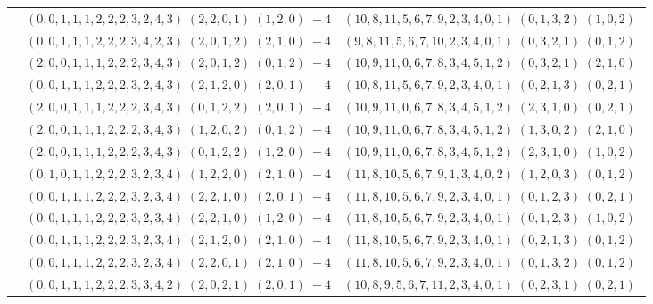 \documentclass[11pt]{article}
\begin{document}
\begin{longtable}[l]{|c|c|c|}
 \cline{2-3} 
 & $(0 ,0 ,1 ,1 ,1 ,2 ,2 ,2 ,3 ,2 ,4 ,3) \;(2 ,2 ,0 ,1) \;(1 ,2 ,0) \;-4$ & $(10 ,8 ,11 ,5 ,6 ,7 ,9 ,2 ,3 ,4 ,0 ,1) \;(0 ,1 ,3 ,2) \;(1 ,0 ,2) \;$\\ 
 \cline{2-3} 
 & $(0 ,0 ,1 ,1 ,1 ,2 ,2 ,2 ,3 ,4 ,2 ,3) \;(2 ,0 ,1 ,2) \;(2 ,1 ,0) \;-4$ & $(9 ,8 ,11 ,5 ,6 ,7 ,10 ,2 ,3 ,4 ,0 ,1) \;(0 ,3 ,2 ,1) \;(0 ,1 ,2) \;$\\ 
 \cline{2-3} 
 & $(2 ,0 ,0 ,1 ,1 ,1 ,2 ,2 ,2 ,3 ,4 ,3) \;(2 ,0 ,1 ,2) \;(0 ,1 ,2) \;-4$ & $(10 ,9 ,11 ,0 ,6 ,7 ,8 ,3 ,4 ,5 ,1 ,2) \;(0 ,3 ,2 ,1) \;(2 ,1 ,0) \;$\\ 
 \cline{2-3} 
 & $(0 ,0 ,1 ,1 ,1 ,2 ,2 ,2 ,3 ,2 ,4 ,3) \;(2 ,1 ,2 ,0) \;(2 ,0 ,1) \;-4$ & $(10 ,8 ,11 ,5 ,6 ,7 ,9 ,2 ,3 ,4 ,0 ,1) \;(0 ,2 ,1 ,3) \;(0 ,2 ,1) \;$\\ 
 \cline{2-3} 
 & $(2 ,0 ,0 ,1 ,1 ,1 ,2 ,2 ,2 ,3 ,4 ,3) \;(0 ,1 ,2 ,2) \;(2 ,0 ,1) \;-4$ & $(10 ,9 ,11 ,0 ,6 ,7 ,8 ,3 ,4 ,5 ,1 ,2) \;(2 ,3 ,1 ,0) \;(0 ,2 ,1) \;$\\ 
 \cline{2-3} 
 & $(2 ,0 ,0 ,1 ,1 ,1 ,2 ,2 ,2 ,3 ,4 ,3) \;(1 ,2 ,0 ,2) \;(0 ,1 ,2) \;-4$ & $(10 ,9 ,11 ,0 ,6 ,7 ,8 ,3 ,4 ,5 ,1 ,2) \;(1 ,3 ,0 ,2) \;(2 ,1 ,0) \;$\\ 
 \cline{2-3} 
 & $(2 ,0 ,0 ,1 ,1 ,1 ,2 ,2 ,2 ,3 ,4 ,3) \;(0 ,1 ,2 ,2) \;(1 ,2 ,0) \;-4$ & $(10 ,9 ,11 ,0 ,6 ,7 ,8 ,3 ,4 ,5 ,1 ,2) \;(2 ,3 ,1 ,0) \;(1 ,0 ,2) \;$\\ 
 \cline{2-3} 
 & $(0 ,1 ,0 ,1 ,1 ,2 ,2 ,2 ,3 ,2 ,3 ,4) \;(1 ,2 ,2 ,0) \;(2 ,1 ,0) \;-4$ & $(11 ,8 ,10 ,5 ,6 ,7 ,9 ,1 ,3 ,4 ,0 ,2) \;(1 ,2 ,0 ,3) \;(0 ,1 ,2) \;$\\ 
 \cline{2-3} 
 & $(0 ,0 ,1 ,1 ,1 ,2 ,2 ,2 ,3 ,2 ,3 ,4) \;(2 ,2 ,1 ,0) \;(2 ,0 ,1) \;-4$ & $(11 ,8 ,10 ,5 ,6 ,7 ,9 ,2 ,3 ,4 ,0 ,1) \;(0 ,1 ,2 ,3) \;(0 ,2 ,1) \;$\\ 
 \cline{2-3} 
 & $(0 ,0 ,1 ,1 ,1 ,2 ,2 ,2 ,3 ,2 ,3 ,4) \;(2 ,2 ,1 ,0) \;(1 ,2 ,0) \;-4$ & $(11 ,8 ,10 ,5 ,6 ,7 ,9 ,2 ,3 ,4 ,0 ,1) \;(0 ,1 ,2 ,3) \;(1 ,0 ,2) \;$\\ 
 \cline{2-3} 
 & $(0 ,0 ,1 ,1 ,1 ,2 ,2 ,2 ,3 ,2 ,3 ,4) \;(2 ,1 ,2 ,0) \;(2 ,1 ,0) \;-4$ & $(11 ,8 ,10 ,5 ,6 ,7 ,9 ,2 ,3 ,4 ,0 ,1) \;(0 ,2 ,1 ,3) \;(0 ,1 ,2) \;$\\ 
 \cline{2-3} 
 & $(0 ,0 ,1 ,1 ,1 ,2 ,2 ,2 ,3 ,2 ,3 ,4) \;(2 ,2 ,0 ,1) \;(2 ,1 ,0) \;-4$ & $(11 ,8 ,10 ,5 ,6 ,7 ,9 ,2 ,3 ,4 ,0 ,1) \;(0 ,1 ,3 ,2) \;(0 ,1 ,2) \;$\\ 
 \cline{2-3} 
 & $(0 ,0 ,1 ,1 ,1 ,2 ,2 ,2 ,3 ,3 ,4 ,2) \;(2 ,0 ,2 ,1) \;(2 ,0 ,1) \;-4$ & $(10 ,8 ,9 ,5 ,6 ,7 ,11 ,2 ,3 ,4 ,0 ,1) \;(0 ,2 ,3 ,1) \;(0 ,2 ,1) \;$\\ 

\end{longtable}
\end{document}
